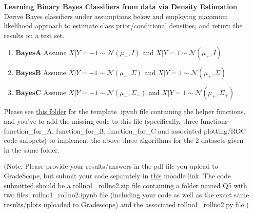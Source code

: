 \documentclass[solution,addpoints,12pt]{exam}
\begin{document}
\begin{questions}
\textbf{Learning Binary Bayes Classifiers from data via Density Estimation}\\
Derive Bayes classifiers under assumptions below and employing maximum likelihood approach to estimate class prior/conditional densities, and return the results on a test set.
\begin{enumerate}
\item \textbf{BayesA} Assume $X|Y=-1 \sim \mathcal{N}(\mu_-, I)$ and  $X|Y=1 \sim \mathcal{N}(\mu_+, I)$ 
\item \textbf{BayesB} Assume $X|Y=-1 \sim \mathcal{N}(\mu_-, \Sigma)$ and $X|Y=1 \sim \mathcal{N}(\mu_+, \Sigma)$ 
\item \textbf{BayesC} Assume $X|Y=-1 \sim \mathcal{N}(\mu_-, \Sigma_-)$ and $X|Y=1 \sim \mathcal{N}(\mu_+, \Sigma_+)$ 
\end{enumerate}
Please see \href{https://drive.google.com/drive/folders/1MDxrvvLGkw9fjpII0eRzfPZ6iJV4MoQN?usp=sharing}{this folder} for the template .ipynb file containing the helper functions, and you've to add the missing code to this file (specifically, three functions function\_for\_A, function\_for\_B, function\_for\_C and associated plotting/ROC code snippets) to implement the above three algorithms for the 2 datasets given in the same folder. 

(Note: Please provide your results/answers in the pdf file you upload to GradeScope, but submit your code separately in \href{https://courses.iitm.ac.in/mod/assign/view.php?id=8597&forceview=1}{this} moodle link. The code submitted should be a rollno1\_rollno2.zip file containing a folder named Q5 with two files: rollno1\_rollno2.ipynb file (including your code as well as the exact same results/plots uploaded to Gradescope) and the associated rollno1\_rollno2.py file.)

\end{questions}
\end{document}
